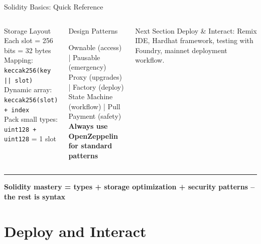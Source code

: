 \documentclass[8pt,aspectratio=169]{beamer}
\newcommand{\bottomnote}[1]{\vfill\vspace{-2mm}\textcolor{mllavender2}{\rule{\textwidth}{0.4pt}}\vspace{1mm}\footnotesize\textbf{#1}}
\begin{document}
\begin{frame}{Solidity Basics: Quick Reference}
\begin{columns}
\begin{block}{Storage Layout}
{{Each slot = 256 bits = 32 bytes\\
Mapping: \texttt{keccak256(key || slot)}\\
Dynamic array: \texttt{keccak256(slot) + index}\\
Pack small types: \texttt{uint128 + uint128} = 1 slot
}}
\end{block}
\vspace{1mm}
\begin{block}{Design Patterns}
\colorbox{mlblue!10}{\parbox{0.92\linewidth}{\small
Ownable (access) | Pausable (emergency)\\
Proxy (upgrades) | Factory (deploy)\\
State Machine (workflow) | Pull Payment (safety)\\
\textbf{Always use OpenZeppelin for standard patterns}
}}
\end{block}
\vspace{1mm}
\begin{alertblock}{Next Section}
\small Deploy \& Interact: Remix IDE, Hardhat framework, testing with Foundry, mainnet deployment workflow.
\end{alertblock}
\end{columns}
\bottomnote{Solidity mastery = types + storage optimization + security patterns -- the rest is syntax}
\end{frame}


\section{Deploy and Interact}
\end{document}
